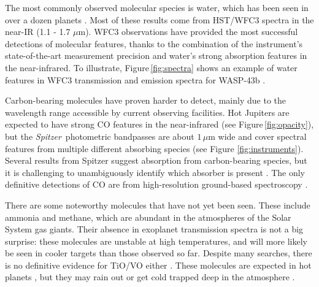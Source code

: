 \documentclass[graybox,natbib,nosecnum]{svmult}
\newcommand{\project}[1]{\textsl{#1}}
\newcommand{\Spitzer}{\project{Spitzer}}
\begin{document}
The most commonly observed molecular species is water, which has been seen in over a dozen planets \citep[e.g.][]{deming13, huitson13, birkby13, mccullough14, fraine14, kreidberg14b, kreidberg15b, line16, evans16, stevenson16b}. Most of these results come from HST/WFC3 spectra in the near-IR (1.1 - 1.7 $\mu$m). WFC3 observations have provided the most successful detections of molecular features, thanks to the combination of the instrument's state-of-the-art measurement precision and water's strong absorption features in the near-infrared.  To illustrate, Figure\,\ref{fig:spectra} shows an example of water features in WFC3 transmission and emission spectra for WASP-43b \citep{kreidberg14b}.  


Carbon-bearing molecules have proven harder to detect, mainly due to the wavelength range accessible by current observing facilities. Hot Jupiters are expected to have strong CO features in the near-infrared (see Figure\,\ref{fig:opacity}), but the \Spitzer\ photometric bandpasses are about $1\,\mu$m wide and cover spectral features from multiple different absorbing species (see Figure \ref{fig:instruments}). Several results from Spitzer suggest absorption from carbon-bearing species, but it is challenging to unambiguously identify which absorber is present \citep[e.g.][]{desert09, stevenson10, madhusudhan11, morley17}.  The only definitive detections of CO are from high-resolution ground-based spectroscopy \citep{dekok13,brogi14}.  

There are some noteworthy molecules that have not yet been seen. These include ammonia and methane, which are abundant in the atmospheres of the Solar System gas giants. Their absence in exoplanet transmission spectra is not a big surprise: these molecules are unstable at high temperatures, and will more likely be seen in cooler targets than those observed so far.  Despite many searches, there is no definitive evidence for TiO/VO either \citep[e.g.,][]{sing13, evans16}. These molecules are expected in hot planets \citep{fortney08}, but they may rain out or get cold trapped deep in the atmosphere \citep{parmentier13}.
\end{document}
